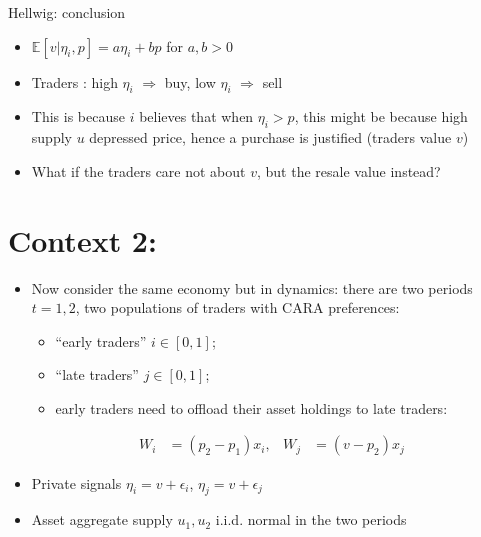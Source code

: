 \documentclass[english,10pt
,aspectratio=169
]{beamer}
\begin{document}
\begin{frame}{Hellwig: conclusion}
	\begin{itemize}
		\item $\mathbb{E} \left[ v | \eta_i, p\right] = a \eta_i + b p$ for $a,b>0$
		\item Traders : high $\eta_i$ $\Rightarrow$ buy, low $\eta_i$ $\Rightarrow$ sell
		\item This is because $i$ believes that when $\eta_i > p$, this might be because high supply $u$ depressed price, hence a purchase is justified (traders  value $v$)
		\pause\bigskip
		\item What if the traders care not about $v$, but the resale value instead?
	\end{itemize}
\end{frame}



\section{Context 2: \cite{brown_technical_1989}}

\begin{frame}{\cite{brown_technical_1989}}
	\begin{itemize}
		\item Now consider the same economy but in dynamics: there are two periods $t=1,2$, two populations of traders with CARA preferences:
		\begin{itemize}
			\item ``early traders'' $i \in [0,1]$;
			\item ``late traders'' $j \in [0,1]$;
			\item early traders need to offload their asset holdings to late traders:
		\end{itemize}
		\begin{align*}
			W_i & = (p_2 - p_1) x_i, &
			W_j & = (v - p_2) x_j
		\end{align*}
		\item Private signals $\eta_i = v + \epsilon_i$, $\eta_j = v + \epsilon_j$
		\item Asset aggregate supply $u_1,u_2$ i.i.d. normal in the two periods
	\end{itemize}
\end{frame}
\end{document}
